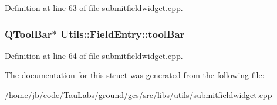 \-Definition at line 63 of file submitfieldwidget.\-cpp.

\hypertarget{struct_utils_1_1_field_entry_a87467dace17a68b94a3815c9cbdd4a8c}{
\subsubsection[{tool\-Bar}]{\setlength{\rightskip}{0pt plus 5cm}\-Q\-Tool\-Bar$\ast$ {\bf \-Utils\-::\-Field\-Entry\-::tool\-Bar}}}\label{struct_utils_1_1_field_entry_a87467dace17a68b94a3815c9cbdd4a8c}


\-Definition at line 64 of file submitfieldwidget.\-cpp.



\-The documentation for this struct was generated from the following file\-:\begin{DoxyCompactItemize}
\item 
/home/jb/code/\-Tau\-Labs/ground/gcs/src/libs/utils/\hyperlink{submitfieldwidget_8cpp}{submitfieldwidget.\-cpp}\end{DoxyCompactItemize}
